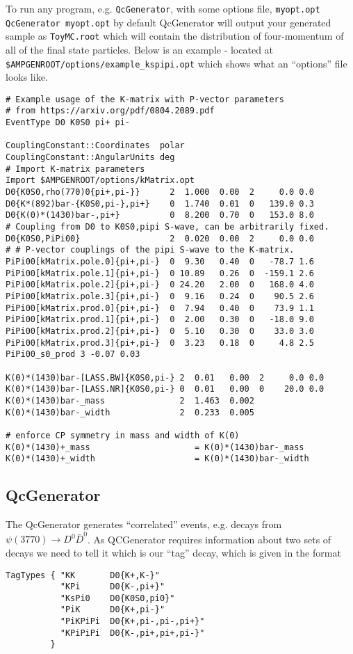 \documentclass{article}
\begin{document}
To run any program, e.g. \texttt{QcGenerator}, with some options file, \texttt{myopt.opt}
\texttt{QcGenerator myopt.opt}
by default QcGenerator will output your generated sample as \texttt{ToyMC.root} which will contain the distribution of four-momentum of all of the final state particles. 
Below is an example - located at \texttt{\$AMPGENROOT/options/example\_kspipi.opt} which shows what an ``options'' file looks like. 
\begin{lstlisting}
# Example usage of the K-matrix with P-vector parameters
# from https://arxiv.org/pdf/0804.2089.pdf 
EventType D0 K0S0 pi+ pi- 

CouplingConstant::Coordinates  polar
CouplingConstant::AngularUnits deg 
# Import K-matrix parameters 
Import $AMPGENROOT/options/kMatrix.opt
D0{K0S0,rho(770)0{pi+,pi-}}      2  1.000  0.00  2     0.0 0.0 
D0{K*(892)bar-{K0S0,pi-},pi+}    0  1.740  0.01  0   139.0 0.3
D0{K(0)*(1430)bar-,pi+}          0  8.200  0.70  0   153.0 8.0
# Coupling from D0 to K0S0,pipi S-wave, can be arbitrarily fixed.
D0{K0S0,PiPi00}                  2  0.020  0.00  2     0.0 0.0 
# # P-vector couplings of the pipi S-wave to the K-matrix. 
PiPi00[kMatrix.pole.0]{pi+,pi-}  0  9.30   0.40  0   -78.7 1.6
PiPi00[kMatrix.pole.1]{pi+,pi-}  0 10.89   0.26  0  -159.1 2.6
PiPi00[kMatrix.pole.2]{pi+,pi-}  0 24.20   2.00  0   168.0 4.0
PiPi00[kMatrix.pole.3]{pi+,pi-}  0  9.16   0.24  0    90.5 2.6
PiPi00[kMatrix.prod.0]{pi+,pi-}  0  7.94   0.40  0    73.9 1.1
PiPi00[kMatrix.prod.1]{pi+,pi-}  0  2.00   0.30  0   -18.0 9.0
PiPi00[kMatrix.prod.2]{pi+,pi-}  0  5.10   0.30  0    33.0 3.0
PiPi00[kMatrix.prod.3]{pi+,pi-}  0  3.23   0.18  0     4.8 2.5
PiPi00_s0_prod 3 -0.07 0.03

K(0)*(1430)bar-[LASS.BW]{K0S0,pi-} 2  0.01   0.00  2     0.0 0.0
K(0)*(1430)bar-[LASS.NR]{K0S0,pi-} 0  0.01   0.00  0    20.0 0.0
K(0)*(1430)bar-_mass               2  1.463  0.002
K(0)*(1430)bar-_width              2  0.233  0.005

# enforce CP symmetry in mass and width of K(0)
K(0)*(1430)+_mass                     = K(0)*(1430)bar-_mass   
K(0)*(1430)+_width                    = K(0)*(1430)bar-_width
\end{lstlisting}

\subsection{QcGenerator}
The QcGenerator generates ``correlated'' events, e.g. decays from $\psi(3770) \to D^0 \bar{D}^0$. 
As QCGenerator requires information about two sets of decays we need to tell it which is our ``tag'' decay, which is given in the format
\begin{lstlisting}
TagTypes { "KK       D0{K+,K-}"
           "KPi      D0{K-,pi+}"
           "KsPi0    D0{K0S0,pi0}"
           "PiK      D0{K+,pi-}"
           "PiKPiPi  D0{K+,pi-,pi-,pi+}"
           "KPiPiPi  D0{K-,pi+,pi+,pi-}"
         }
\end{lstlisting}
\end{document}
